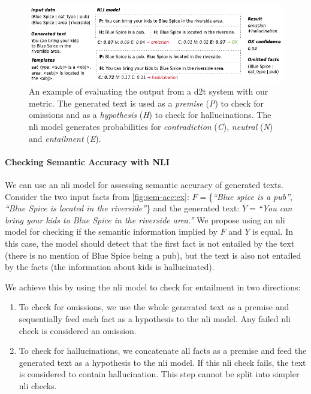 \begin{figure}[t]
    \centering
    \includegraphics[width=\textwidth]{img/2020_nli_inlg}
    \caption[Our semantic accuracy metric.]{An example of evaluating the output from a \ac{d2t} system with our metric. The generated text is used as a \textit{premise} (\textit{P}) to check for omissions and as a \textit{hypothesis} (\textit{H}) to check for hallucinations. The \ac{nli} model generates probabilities for \textit{contradiction} (\textit{C}), \textit{neutral} (\textit{N}) and \textit{entailment} (\textit{E}).}
    \label{fig:sem-acc:ex}
\end{figure}

\paragraph{Checking Semantic Accuracy with NLI} We can use an \ac{nli} model for assessing semantic accuracy of generated texts. Consider the two input facts from \autoref{fig:sem-acc:ex}: $F= $\{\emph{``Blue spice is a pub''}, \emph{``Blue Spice is located in the riverside''}\} and the generated text: $Y= $\emph{``You can bring your kids to Blue Spice in the riverside area.''} We propose using an \ac{nli} model for checking if the semantic information implied by $F$ and $Y$ is equal.
In this case, the model should detect that the first fact is not entailed by the text (there is no mention of Blue Spice being a pub), but the text is also not entailed by the facts (the information about kids is hallucinated).

We achieve this by using the \ac{nli} model to check for entailment in two directions:
\begin{enumerate}
    \item To check for \textrm{omissions}, we use the whole generated text as a premise and sequentially feed each fact as a hypothesis to the \ac{nli} model. Any failed \ac{nli} check is considered an omission.
    \item To check for \textrm{hallucinations}, we concatenate all facts as a premise and feed the generated text as a hypothesis to the \ac{nli} model. If this \ac{nli} check fails, the text is considered to contain hallucination. This step cannot be split into simpler \ac{nli} checks.
\end{enumerate}

